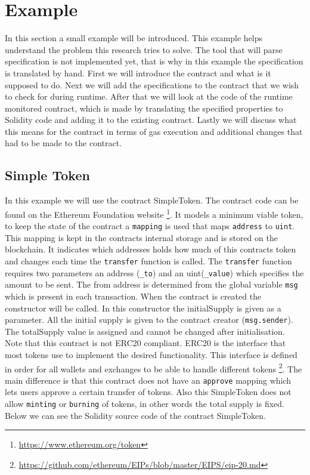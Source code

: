 \documentclass[a4paper]{article}
\begin{document}
\section{Example}
In this section a small example will be introduced. This example helps understand the problem this research tries to solve. The tool that will parse specification is not implemented yet, that is why in this example the specification is translated by hand. First we will introduce the contract and what is it supposed to do. Next we will add the specifications to the contract that we wish to check for during runtime. After that we will look at the code of the runtime monitored contract, which is made by translating the specified properties to Solidity code and adding it to the existing contract. Lastly we will discuss what this means for the contract in terms of gas execution and additional changes that had to be made to the contract.

\subsection{Simple Token}
In this example we will use the contract SimpleToken. The contract code can be found on the Ethereum Foundation website \footnote{\url{https://www.ethereum.org/token}}. 
It models a minimum viable token, to keep the state of the contract a \texttt{mapping} is used that maps \texttt{address} to \texttt{uint}. This mapping is kept in the contracts internal storage and is stored on the blockchain. It indicates which addresses holds how much of this contracts token and changes each time the \texttt{transfer} function is called. The \texttt{transfer} function requires two parameters an address (\texttt{\_to})  and an uint(\texttt{\_value}) which specifies the amount to be sent. The from address is determined from the global variable \texttt{msg} which is present in each transaction. When the contract is created the constructor will be called. In this constructor the initialSupply is given as a parameter. All the initial supply is given to the contract creator (\texttt{msg.sender}). The totalSupply value is assigned and cannot be changed after initialisation.\\
Note that this contract is not ERC20 compliant. ERC20 is the interface that most tokens use to implement the desired functionality. This interface is defined in order for all wallets and exchanges to be able to handle different tokens \footnote{\url{https://github.com/ethereum/EIPs/blob/master/EIPS/eip-20.md}}. The main difference is that this contract does not have an \texttt{approve} mapping which lets users approve a certain transfer of tokens. Also this SimpleToken does not allow \texttt{minting} or \texttt{burning} of tokens, in other words the total supply is fixed. Below we can see the Solidity source code of the contract SimpleToken.
\end{document}
